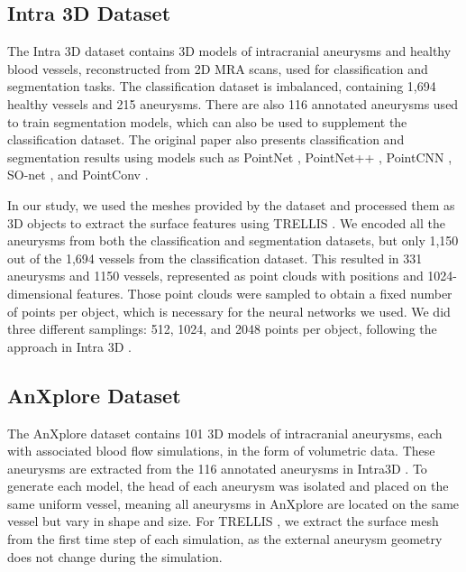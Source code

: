 \documentclass[%
 reprint,
 amsmath,amssymb,
 aps,
 floatfix,
 nofootinbib,
]{revtex4-2}
\begin{document}
\subsection{Intra 3D Dataset} \label{INTRA3D}

The Intra 3D dataset \citep{yang2020intra} contains 3D models of intracranial aneurysms and healthy blood vessels, reconstructed from 2D MRA scans, used for classification and segmentation tasks. The classification dataset is imbalanced, containing 1,694 healthy vessels and 215 aneurysms. There are also 116 annotated aneurysms used to train segmentation models, which can also be used to supplement the classification dataset. The original paper also presents classification and segmentation results using models such as PointNet \citep{pointnet}, PointNet++ \citep{pointnetpp}, PointCNN \citep{pointcnn}, SO-net \citep{sonet}, and PointConv \citep{pointconv}.

In our study, we used the meshes provided by the dataset and processed them as 3D objects to extract the surface features using TRELLIS \citep{xiang2024structured}. We encoded all the aneurysms from both the classification and segmentation datasets, but only 1,150 out of the 1,694 vessels from the classification dataset. This resulted in 331 aneurysms and 1150 vessels, represented as point clouds with positions and 1024-dimensional features. Those point clouds were sampled to obtain a fixed number of points per object, which is necessary for the neural networks we used. We did three different samplings: 512, 1024, and 2048 points per object, following the approach in Intra 3D \citep{yang2020intra}. 

\subsection{AnXplore Dataset} \label{ANXPLORE}

The AnXplore dataset \citep{anxplore} contains 101 3D models of intracranial aneurysms, each with associated blood flow simulations, in the form of volumetric data. These aneurysms are extracted from the 116 annotated aneurysms in Intra3D \citep{yang2020intra}. To generate each model, the head of each aneurysm was isolated and placed on the same uniform vessel, meaning all aneurysms in AnXplore \citep{anxplore} are located on the same vessel but vary in shape and size. For TRELLIS \citep{xiang2024structured}, we extract the surface mesh from the first time step of each simulation, as the external aneurysm geometry does not change during the simulation.
\end{document}
